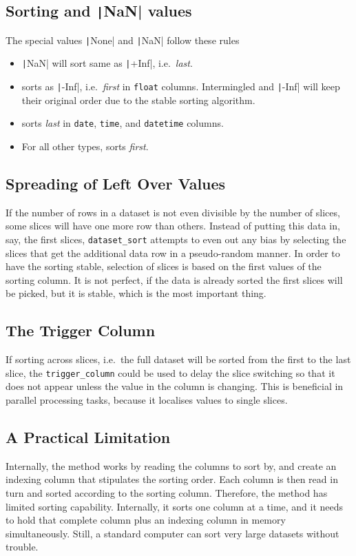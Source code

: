 \subsection{Sorting \pyNone and \texttt|NaN| values}
The special values \texttt|None| and \texttt|NaN| follow these rules
\begin{itemize}
\item \texttt|NaN| will sort same as \texttt|+Inf|, i.e.\ \textsl{last}.
\item \pyNone sorts as \texttt|-Inf|, i.e.\ \textsl{first} in \texttt{float} columns.  Intermingled \pyNone and \texttt|-Inf| will keep their original order due to the stable sorting algorithm.
\item \pyNone sorts \textsl{last} in \texttt{date}, \texttt{time}, and \texttt{datetime} columns.
\item For all other types, \pyNone sorts \textsl{first}.
\end{itemize}


\subsection{Spreading of Left Over Values}
If the number of rows in a dataset is not even divisible by the number
of slices, some slices will have one more row than others.  Instead of
putting this data in, say, the first slices, \texttt{dataset\_sort}
attempts to even out any bias by selecting the slices that get the
additional data row in a pseudo-random manner.  In order to have the
sorting stable, selection of slices is based on the first values of
the sorting column.  It is not perfect, if the data is already sorted
the first slices will be picked, but it is stable, which is the most
important thing.



\subsection{The Trigger Column}
If sorting across slices, i.e.\ the full dataset will be sorted from
the first to the last slice, the \texttt{trigger\_column} could be
used to delay the slice switching so that it does not appear unless
the value in the column is changing.  This is beneficial in parallel
processing tasks, because it localises values to single slices.



\subsection{A Practical Limitation}
Internally, the method works by reading the columns to sort by, and
create an indexing column that stipulates the sorting order.  Each
column is then read in turn and sorted according to the sorting
column.  Therefore, the method has limited sorting capability.
Internally, it sorts one column at a time, and it needs to hold that
complete column plus an indexing column in memory simultaneously.
Still, a standard computer can sort very large datasets without
trouble.



